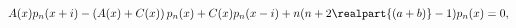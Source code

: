 \[A(x)p_{n}(x+i)-\left(A(x)+C(x)\right)p_{n}(x)+C(x)p_{n}(x-i)+n(n+2\realpart{(a%
+b)}-1)p_{n}(x)=0,\]